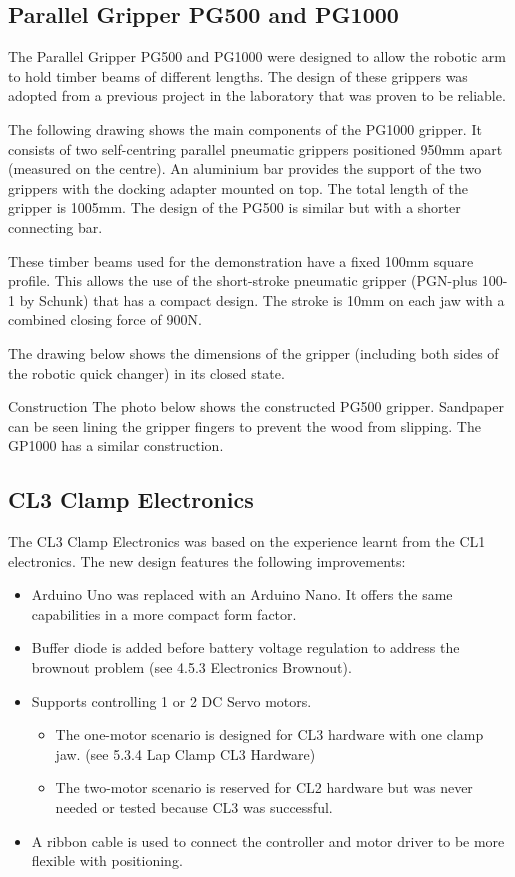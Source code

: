 \subsection{Parallel Gripper PG500 and PG1000}

The Parallel Gripper PG500 and PG1000 were designed to allow the robotic arm to hold timber beams of different lengths. The design of these grippers was adopted from a previous project in the laboratory that was proven to be reliable. 

The following drawing shows the main components of the PG1000 gripper. It consists of two self-centring parallel pneumatic grippers positioned 950mm apart (measured on the centre). An aluminium bar provides the support of the two grippers with the docking adapter mounted on top. The total length of the gripper is 1005mm. The design of the PG500 is similar but with a shorter connecting bar. 

These timber beams used for the demonstration have a fixed 100mm square profile. This allows the use of the short-stroke pneumatic gripper (PGN-plus 100-1 by Schunk) that has a compact design. The stroke is 10mm on each jaw with a combined closing force of 900N. 

The drawing below shows the dimensions of the gripper (including both sides of the robotic quick changer) in its closed state. 

Construction
The photo below shows the constructed PG500 gripper. Sandpaper can be seen lining the gripper fingers to prevent the wood from slipping. The GP1000 has a similar construction. 

\subsection{CL3 Clamp Electronics}

The CL3 Clamp Electronics was based on the experience learnt from the CL1 electronics. The new design features the following improvements:
\begin{itemize}
    \item Arduino Uno was replaced with an Arduino Nano. It offers the same capabilities in a more compact form factor.
    \item Buffer diode is added before battery voltage regulation to address the brownout problem (see 4.5.3 Electronics Brownout).
    \item Supports controlling 1 or 2 DC Servo motors. 
    \begin{itemize}
        \item The one-motor scenario is designed for CL3 hardware with one clamp jaw. (see 5.3.4 Lap Clamp CL3 Hardware)
        \item The two-motor scenario is reserved for CL2 hardware but was never needed or tested because CL3 was successful.
    \end{itemize}
    \item A ribbon cable is used to connect the controller and motor driver to be more flexible with positioning.
\end{itemize}


